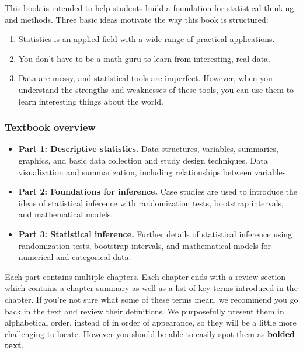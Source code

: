 \documentclass[
  10pt,
  openany]{book}
\providecommand{\tightlist}{%
  \setlength{\itemsep}{0pt}\setlength{\parskip}{0pt}}
\begin{document}
This book is intended to help students build a foundation for statistical thinking and methods. Three basic ideas motivate the way this book is structured:

\begin{enumerate}
\def\labelenumi{\arabic{enumi}.}
\tightlist
\item
  Statistics is an applied field with a wide range of practical applications.
\item
  You don't have to be a math guru to learn from interesting, real data.
\item
  Data are messy, and statistical tools are imperfect. However, when you understand the strengths and weaknesses of these tools, you can use them to learn interesting things about the world.
\end{enumerate}

\hypertarget{textbook-overview}{%
\subsubsection*{Textbook overview}\label{textbook-overview}}

\begin{itemize}
\tightlist
\item
  \textbf{Part 1: Descriptive statistics.} Data structures, variables, summaries, graphics, and basic data collection and study design techniques. Data visualization and summarization, including relationships between variables.
\item
  \textbf{Part 2: Foundations for inference.} Case studies are used to introduce the ideas of statistical inference with randomization tests, bootstrap intervals, and mathematical models.
\item
  \textbf{Part 3: Statistical inference.} Further details of statistical inference using randomization tests, bootstrap intervals, and mathematical models for numerical and categorical data.
\end{itemize}

Each part contains multiple chapters.
Each chapter ends with a review section which contains a chapter summary as well as a list of key terms introduced in the chapter.
If you're not sure what some of these terms mean, we recommend you go back in the text and review their definitions.
We purposefully present them in alphabetical order, instead of in order of appearance, so they will be a little more challenging to locate.
However you should be able to easily spot them as \textbf{bolded text}.
\end{document}
